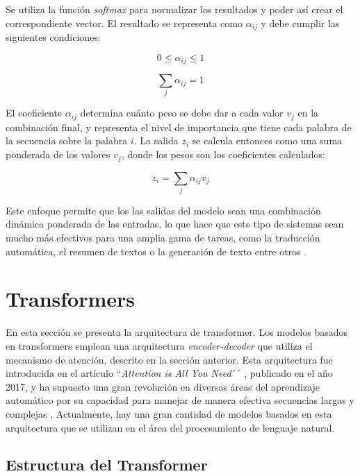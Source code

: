 \documentclass[11pt,spanish,listoffigures,listoftables]{tfgetsinf}
\begin{document}
Se utiliza la función \textit{softmax} para normalizar los resultados y poder así crear el correspondiente vector. El resultado se representa como $\alpha_{ij}$ y debe cumplir las siguientes condiciones:

\begin{equation}
0 \le \alpha_{ij} \le 1
\end{equation}

\begin{equation}
\sum_j\alpha_{ij} = 1
\end{equation}

El coeficiente $\alpha_{ij}$ determina cuánto peso se debe dar a cada valor $v_j$ en la combinación final, y representa el nivel de importancia que tiene cada palabra de la secuencia sobre la palabra $i$. La salida $z_i$ se calcula entonces como una suma ponderada de los valores $v_j$, donde los pesos son los coeficientes calculados:

\begin{equation}
z_i = \sum_j\alpha_{ij}v_j
\end{equation}

Este enfoque permite que los las salidas del modelo sean una combinación dinámica ponderada de las entradas, lo que hace que este tipo de sistemas sean mucho más efectivos para una amplia gama de tareas, como la traducción automática, el resumen de textos o la generación de texto entre otros \cite{murphy2022probabilistic, jurafsky2023speech}.

\section{Transformers} \label{transformers}

En esta sección se presenta la arquitectura de transformer. Los modelos basados en transformers emplean una arquitectura \textit{encoder-decoder} que utiliza el mecanismo de atención, descrito en la sección anterior. Esta arquitectura fue introducida en el artículo ``\textit{Attention is All You Need}´´ \cite{vaswani2023attentionneed}, publicado en el año 2017, y ha supuesto una gran revolución en diversas áreas del aprendizaje automático por su capacidad para manejar de manera efectiva secuencias largas y complejas \cite{dai2019transformerxlattentivelanguagemodels}. Actualmente, hay una gran cantidad de modelos basados en esta arquitectura que se utilizan en el área del procesamiento de lenguaje natural.

\subsection{Estructura del Transformer}
\end{document}
